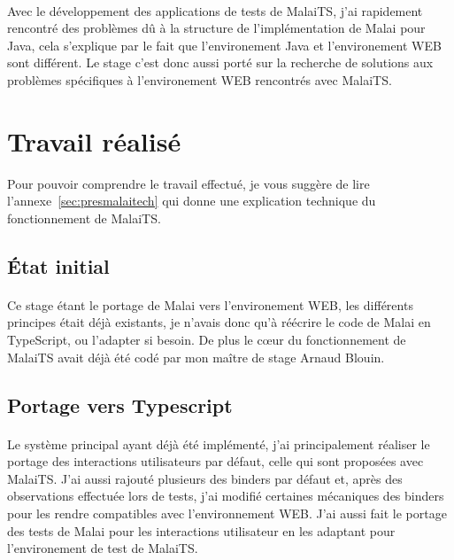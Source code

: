 \documentclass[11pt, a4paper, pdftex]{article}
\begin{document}
            \paragraph{}
                Avec le développement des applications de tests de MalaiTS, j'ai rapidement rencontré des problèmes dû à la structure de l'implémentation de Malai pour Java,
                cela s'explique par le fait que l'environement Java et l'environement WEB sont différent.
                Le stage c'est donc aussi porté sur la recherche de solutions aux problèmes spécifiques à l'environement WEB rencontrés avec MalaiTS\@.
    \newpage
    \section{Travail réalisé}\label{sec:trarea}
        Pour pouvoir comprendre le travail effectué, je vous suggère de lire l'annexe~\ref{sec:presmalaitech} qui donne une explication technique du fonctionnement de MalaiTS\@.

        \subsection{État initial}\label{subsec:travinit}
            \paragraph{}
                Ce stage étant le portage de Malai vers l'environement WEB, les différents principes était déjà existants, je n'avais donc qu'à réécrire le code de Malai en TypeScript, ou l'adapter si besoin.
                De plus le c\oe ur du fonctionnement de MalaiTS avait déjà été codé par mon maître de stage Arnaud Blouin.

        \subsection{Portage vers Typescript}\label{subsec:mainjob}
            \paragraph{}
                Le système principal ayant déjà été implémenté, j'ai principalement réaliser le portage des interactions utilisateurs par défaut, celle qui sont proposées avec MalaiTS\@.
                J'ai aussi rajouté plusieurs des binders par défaut et, après des observations effectuée lors de tests, j'ai modifié certaines mécaniques
                des binders pour les rendre compatibles avec l'environnement WEB\@.
                J'ai aussi fait le portage des tests de Malai pour les interactions utilisateur en les adaptant pour l'environement de test de MalaiTS\@.
\end{document}
